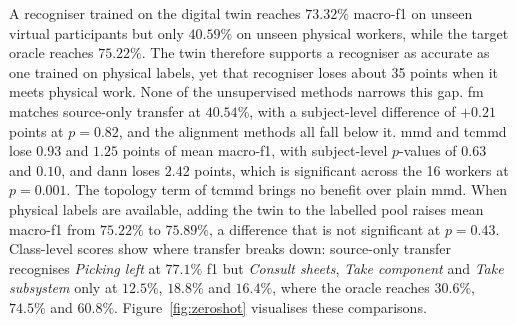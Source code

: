 \documentclass[Afour,sagev,times]{sagej}
\begin{document}
\begin{table}[!t]
  \centering
  \caption{Zero-shot transfer and supervised controls over 12 runs.}
  \label{tab:main}
  \small
\end{table}

A recogniser trained on the digital twin reaches $73.32\%$ macro-\ac{f1} on
unseen virtual participants but only $40.59\%$ on unseen physical workers,
while the target oracle reaches $75.22\%$. The twin therefore supports a
recogniser as accurate as one trained on physical labels, yet that recogniser
loses about 35 points when it meets physical work. None of the unsupervised
methods narrows this gap. \ac{fm} matches source-only transfer at $40.54\%$,
with a subject-level difference of $+0.21$ points at $p=0.82$, and the
alignment methods all fall below it. \ac{mmd} and \ac{tcmmd} lose $0.93$ and
$1.25$ points of mean macro-\ac{f1}, with subject-level $p$-values of $0.63$
and $0.10$, and \ac{dann} loses $2.42$ points, which is significant across the
16 workers at $p=0.001$. The topology term of \ac{tcmmd} brings no benefit over
plain \ac{mmd}. When physical labels are available, adding the twin to the
labelled pool raises mean macro-\ac{f1} from $75.22\%$ to $75.89\%$, a
difference that is not significant at $p=0.43$. Class-level scores show where
transfer breaks down: source-only transfer recognises \emph{Picking left} at
$77.1\%$ \ac{f1} but \emph{Consult sheets}, \emph{Take component} and
\emph{Take subsystem} only at $12.5\%$, $18.8\%$ and $16.4\%$, where the oracle
reaches $30.6\%$, $74.5\%$ and $60.8\%$. Figure~\ref{fig:zeroshot} visualises
these comparisons.
\end{document}
